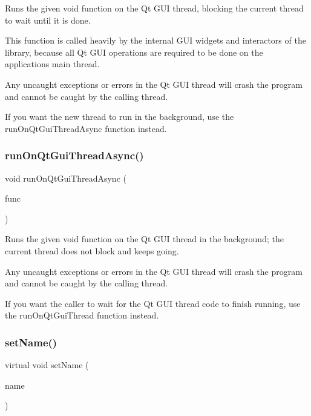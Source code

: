 Runs the given void function on the Qt G\+UI thread, blocking the current thread to wait until it is done. 

This function is called heavily by the internal G\+UI widgets and interactors of the library, because all Qt G\+UI operations are required to be done on the application\textquotesingle{}s main thread.

Any uncaught exceptions or errors in the Qt G\+UI thread will crash the program and cannot be caught by the calling thread.

If you want the new thread to run in the background, use the {\ttfamily run\+On\+Qt\+Gui\+Thread\+Async} function instead. \mbox{\label{classsgl_1_1GThread_a4445680030c65d610b9e348d8d0cffc8}} 
\subsubsection{\texorpdfstring{run\+On\+Qt\+Gui\+Thread\+Async()}{runOnQtGuiThreadAsync()}}
{\footnotesize\ttfamily void run\+On\+Qt\+Gui\+Thread\+Async (\begin{DoxyParamCaption}\item[{\mbox{\hyperlink{namespacesgl_aa508400d1219d217e0e9509ff59a58f4}{G\+Thunk}}}]{func }\end{DoxyParamCaption})\hspace{0.3cm}{\ttfamily [static]}}



Runs the given void function on the Qt G\+UI thread in the background; the current thread does not block and keeps going. 

Any uncaught exceptions or errors in the Qt G\+UI thread will crash the program and cannot be caught by the calling thread.

If you want the caller to wait for the Qt G\+UI thread code to finish running, use the {\ttfamily run\+On\+Qt\+Gui\+Thread} function instead. \mbox{\label{classsgl_1_1GThread_aa384b56425e77d3a0ea434eed3f37b53}} 
\subsubsection{\texorpdfstring{set\+Name()}{setName()}}
{\footnotesize\ttfamily virtual void set\+Name (\begin{DoxyParamCaption}\item[{const std\+::string \&}]{name }\end{DoxyParamCaption})\hspace{0.3cm}{\ttfamily [pure virtual]}}



